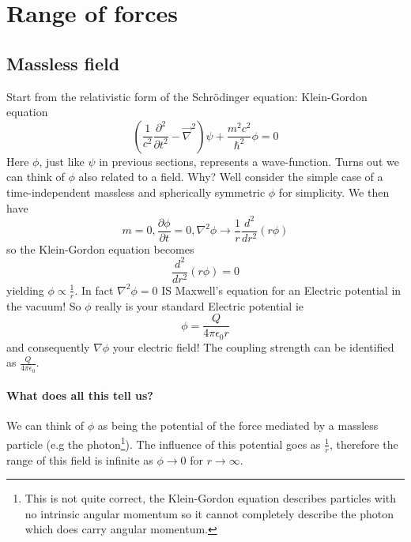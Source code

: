 \section{Range of forces}
\label{sec:force_range}
\subsection{Massless field}
Start from the relativistic form of the Schr\"odinger equation: Klein-Gordon equation
\begin{equation*}
(\frac{1}{c^2}\frac{\partial^{2}}{\partial t^2}-\vec{\nabla}^2)\psi+\frac{m^2c^2}{\hbar^2}\phi=0
\end{equation*}
Here $\phi$, just like $\psi$ in previous sections, represents a wave-function. Turns out we can think of $\phi$ also related to a field. Why? Well consider the simple case of a time-independent massless and spherically symmetric $\phi$ for simplicity. We then have
\[m=0,\frac{\partial\phi}{\partial t}=0,\nabla^2\phi\rightarrow \frac{1}{r}\frac{d^2}{dr^2}(r\phi)
\]
so the Klein-Gordon equation becomes
\[
\frac{d^2}{dr^2}(r\phi)=0
\]
yielding $\phi\propto\frac{1}{r}$. In fact $\nabla^2\phi=0$ IS Maxwell's equation for an Electric potential in the vacuum! So $\phi$ really is your standard Electric potential ie
\[\phi=\frac{Q}{4\pi\epsilon_{0}r}\] and consequently $\nabla\phi$ your electric field! The coupling strength can be identified as $\frac{Q}{4\pi\epsilon_{0}}$.

\paragraph{What does all this tell us?}We can think of $\phi$ as being the potential of the force mediated by a massless particle (e.g the photon\footnote{This is not quite correct, the Klein-Gordon equation describes particles with no intrinsic angular momentum so it cannot completely describe the photon which does carry angular momentum.}). The influence of this potential goes as $\frac{1}{r}$, therefore the range of this field is infinite as $\phi\to0$ for $r\to\infty$. 

